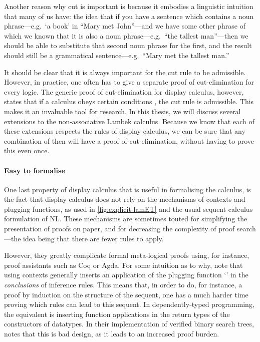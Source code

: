 Another reason why cut is important is because it embodies a
linguistic intuition that many of us have: the idea that if you have a
sentence which contains a noun phrase---e.g.\ `a book' in ``Mary met
John''---and we have some other phrase of which we known that it is
also a noun phrase---e.g.\ ``the tallest man''---then we should be
able to substitute that second noun phrase for the first, and the
result should still be a grammatical sentence---e.g.\ ``Mary met the
tallest man.''

It should be clear that it is always important for the cut rule to be
admissible. However, in practice, one often has to give a separate
proof of cut-elimination for every logic. The generic proof of
cut-elimination for display calculus, however, states that if a
calculus obeys certain conditions \citep[see][]{gore1998}, the cut
rule is admissible.
This makes it an invaluable tool for research. In this thesis, we will
discuss several extensions to the non-associative Lambek calculus.
Because we know that each of these extensions respects the rules of
display calculus, we can be sure that any combination of then will
have a proof of cut-elimination, without having to prove this even
once.

\paragraph{Easy to formalise}
One last property of display calculus that is useful in formalising
the calculus, is the fact that display calculus does not rely on the
mechanisms of contexts and plugging functions, as used in
\autoref{fig:explicit-lamET} and the usual sequent
calculus formulation of NL.
These mechanisms are sometimes touted for simplifying the presentation
of proofs on paper, and for decreasing the complexity of proof
search---the idea being that there are fewer rules to apply.

However, they greatly complicate formal meta-logical proofs using, for
instance, proof assistants such as Coq or Agda.
For some intuition as to why, note that using contexts generally
inserts an application of the plugging function `\plug' in the
\emph{conclusions} of inference rules. This means that, in order to
do, for instance, a proof by induction on the structure of the
sequent, one has a much harder time proving which rules can lead to
this sequent.
In dependently-typed programming, the equivalent is inserting
function applications in the return types of the constructors of
datatypes. In their implementation of verified binary search trees,
\citet{mcbride2014} notes that this is bad design, as it leads to an
increased proof burden.

